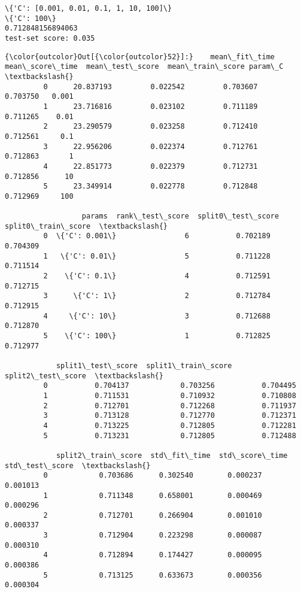 \documentclass[11pt]{article}
\begin{document}
    \begin{Verbatim}[commandchars=\\\{\}]
\{'C': [0.001, 0.01, 0.1, 1, 10, 100]\}
\{'C': 100\}
0.712848156894063
test-set score: 0.035

    \end{Verbatim}

            \begin{Verbatim}[commandchars=\\\{\}]
{\color{outcolor}Out[{\color{outcolor}52}]:}    mean\_fit\_time  mean\_score\_time  mean\_test\_score  mean\_train\_score param\_C  \textbackslash{}
         0      20.837193         0.022542         0.703607          0.703750   0.001   
         1      23.716816         0.023102         0.711189          0.711265    0.01   
         2      23.290579         0.023258         0.712410          0.712561     0.1   
         3      22.956206         0.022374         0.712761          0.712863       1   
         4      22.851773         0.022379         0.712731          0.712856      10   
         5      23.349914         0.022778         0.712848          0.712969     100   
         
                  params  rank\_test\_score  split0\_test\_score  split0\_train\_score  \textbackslash{}
         0  \{'C': 0.001\}                6           0.702189            0.704309   
         1   \{'C': 0.01\}                5           0.711228            0.711514   
         2    \{'C': 0.1\}                4           0.712591            0.712715   
         3      \{'C': 1\}                2           0.712784            0.712915   
         4     \{'C': 10\}                3           0.712688            0.712870   
         5    \{'C': 100\}                1           0.712825            0.712977   
         
            split1\_test\_score  split1\_train\_score  split2\_test\_score  \textbackslash{}
         0           0.704137            0.703256           0.704495   
         1           0.711531            0.710932           0.710808   
         2           0.712701            0.712268           0.711937   
         3           0.713128            0.712770           0.712371   
         4           0.713225            0.712805           0.712281   
         5           0.713231            0.712805           0.712488   
         
            split2\_train\_score  std\_fit\_time  std\_score\_time  std\_test\_score  \textbackslash{}
         0            0.703686      0.302540        0.000237        0.001013   
         1            0.711348      0.658001        0.000469        0.000296   
         2            0.712701      0.266904        0.001010        0.000337   
         3            0.712904      0.223298        0.000087        0.000310   
         4            0.712894      0.174427        0.000095        0.000386   
         5            0.713125      0.633673        0.000356        0.000304   
         

\end{Verbatim}
\end{document}
